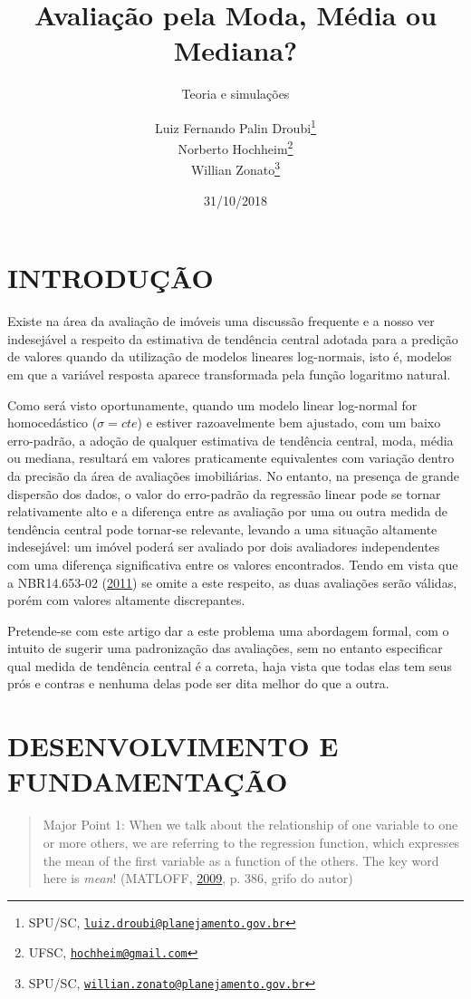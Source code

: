 \documentclass[a4paper, 12pt]{article}
\title{Avaliação pela Moda, Média ou Mediana?}
\subtitle{Teoria e simulações}
\author{Luiz Fernando Palin Droubi\footnote{SPU/SC,
  \href{mailto:luiz.droubi@planejamento.gov.br}{\nolinkurl{luiz.droubi@planejamento.gov.br}}} \\ Norberto Hochheim\footnote{UFSC,
  \href{mailto:hochheim@gmail.com}{\nolinkurl{hochheim@gmail.com}}} \\ Willian Zonato\footnote{SPU/SC,
  \href{mailto:willian.zonato@planejamento.gov.br}{\nolinkurl{willian.zonato@planejamento.gov.br}}}}
\date{31/10/2018}
\begin{document}
\maketitle

\section{INTRODUÇÃO}\label{introducao}

Existe na área da avaliação de imóveis uma discussão frequente e a nosso
ver indesejável a respeito da estimativa de tendência central adotada
para a predição de valores quando da utilização de modelos lineares
log-normais, isto é, modelos em que a variável resposta aparece
transformada pela função logaritmo natural.

Como será visto oportunamente, quando um modelo linear log-normal for
homocedástico (\(\sigma=cte\)) e estiver razoavelmente bem ajustado, com
um baixo erro-padrão, a adoção de qualquer estimativa de tendência
central, moda, média ou mediana, resultará em valores praticamente
equivalentes com variação dentro da precisão da área de avaliações
imobiliárias. No entanto, na presença de grande dispersão dos dados, o
valor do erro-padrão da regressão linear pode se tornar relativamente
alto e a diferença entre as avaliação por uma ou outra medida de
tendência central pode tornar-se relevante, levando a uma situação
altamente indesejável: um imóvel poderá ser avaliado por dois
avaliadores independentes com uma diferença significativa entre os
valores encontrados. Tendo em vista que a NBR14.653-02
(\protect\hyperlink{ref-NBR1465302}{2011}) se omite a este respeito, as
duas avaliações serão válidas, porém com valores altamente discrepantes.

Pretende-se com este artigo dar a este problema uma abordagem formal,
com o intuito de sugerir uma padronização das avaliações, sem no entanto
especificar qual medida de tendência central é a correta, haja vista que
todas elas tem seus prós e contras e nenhuma delas pode ser dita melhor
do que a outra.

\section{DESENVOLVIMENTO E
FUNDAMENTAÇÃO}\label{desenvolvimento-e-fundamentacao}

\begin{quote}
Major Point 1: When we talk about the relationship of one variable to
one or more others, we are referring to the regression function, which
expresses the mean of the first variable as a function of the others.
The key word here is \emph{mean}! (MATLOFF,
\protect\hyperlink{ref-matloff2009}{2009}, p. 386, grifo do autor)
\end{quote}
\end{document}

